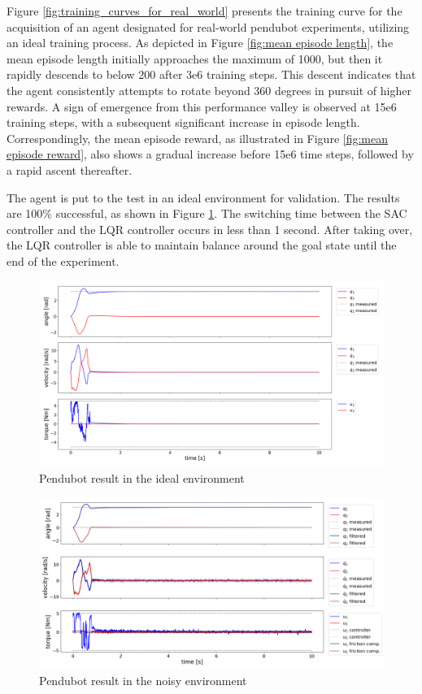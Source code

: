 Figure \ref{fig:training_curves_for_real_world} presents the training curve for the acquisition of an agent designated for real-world pendubot experiments, utilizing an ideal training process. As depicted in Figure \ref{fig:mean episode length}, the mean episode length initially approaches the maximum of 1000, but then it rapidly descends to below 200 after 3e6 training steps. This descent indicates that the agent consistently attempts to rotate beyond 360 degrees in pursuit of higher rewards. A sign of emergence from this performance valley is observed at 15e6 training steps, with a subsequent significant increase in episode length. Correspondingly, the mean episode reward, as illustrated in Figure \ref{fig:mean episode reward}, also shows a gradual increase before 15e6 time steps, followed by a rapid ascent thereafter.

The agent is put to the test in an ideal environment for validation. The results are 100\% successful, as shown in Figure \ref{fig:pendubot_ideal_working}. The switching time between the SAC controller and the LQR controller occurs in less than 1 second. After taking over, the LQR controller is able to maintain balance around the goal state until the end of the experiment.

\begin{figure}[H]
    \centering
    \includegraphics[width=0.95\linewidth]{figures/hardware_result/pendubot_ideal_validation_designC.1.png}
    \caption{Pendubot result in the ideal environment}
    \label{fig:pendubot_ideal_working}
\end{figure}

\begin{figure}[H]
    \centering
    \includegraphics[width=1.0\linewidth]{figures/hardware_result/pendubot_noisy_simulation_designC.1.png}
    \caption{Pendubot result in the noisy environment}
    \label{fig:pendubot_noisy_working}
\end{figure}


